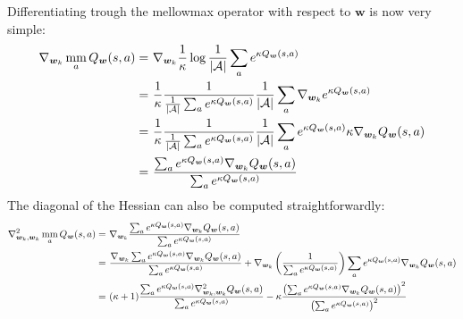 \documentclass{article}
\newcommand{\mm}{\operatornamewithlimits{mm}}
\begin{document}
Differentiating trough the mellowmax operator with respect to $\bm{w}$ is now very simple:
\begin{align}
\nabla_{\bm{w}_k}\mm_a Q_{\bm{w}}(s,a) =\ & 
\nabla_{\bm{w}_k} \frac{1}{\kappa} \log \frac{1}{|\mathcal{A}|}\sum_a e^{\kappa Q_{\bm{w}}(s,a)} \\ =\ &
\frac{1}{\kappa}\frac{1}{\frac{1}{|\mathcal{A}|}\sum_a e^{\kappa Q_{\bm{w}}(s,a)}}\frac{1}{|\mathcal{A}|}\sum_a \nabla_{\bm{w}_k} e^{\kappa Q_{\bm{w}}(s,a)} \\ =\ &
\frac{1}{\kappa}\frac{1}{\frac{1}{|\mathcal{A}|}\sum_a e^{\kappa Q_{\bm{w}}(s,a)}}\frac{1}{|\mathcal{A}|}\sum_a e^{\kappa Q_{\bm{w}}(s,a)} \kappa \nabla_{\bm{w}_k} Q_{\bm{w}}(s,a) \\ =\ &
\frac{\sum_a e^{\kappa Q_{\bm{w}}(s,a)} \nabla_{\bm{w}_k} Q_{\bm{w}}(s,a)}{\sum_a e^{\kappa Q_{\bm{w}}(s,a)}}
\end{align}
The diagonal of the Hessian can also be computed straightforwardly:
\begin{align}
\nabla_{\bm{w}_k,\bm{w}_k}^2 \mm_a Q_{\bm{w}}(s,a) =\ &
\nabla_{\bm{w}_k}\frac{\sum_a e^{\kappa Q_{\bm{w}}(s,a)} \nabla_{\bm{w}_k} Q_{\bm{w}}(s,a)}{\sum_a e^{\kappa Q_{\bm{w}}(s,a)}} \\ =\ &
\frac{\nabla_{\bm{w}_k}\sum_a e^{\kappa Q_{\bm{w}}(s,a)} \nabla_{\bm{w}_k} Q_{\bm{w}}(s,a)}{\sum_a e^{\kappa Q_{\bm{w}}(s,a)}} + \nabla_{\bm{w}_k}\left( \frac{1}{\sum_a e^{\kappa Q_{\bm{w}}(s,a)}} \right)\sum_a e^{\kappa Q_{\bm{w}}(s,a)} \nabla_{\bm{w}_k} Q_{\bm{w}}(s,a) \\ =\ &
(\kappa + 1)\frac{\sum_a e^{\kappa Q_{\bm{w}}(s,a)} \nabla_{\bm{w}_k,\bm{w}_k}^2 Q_{\bm{w}}(s,a)}{\sum_a e^{\kappa Q_{\bm{w}}(s,a)}} - \kappa\frac{\left(\sum_a e^{\kappa Q_{\bm{w}}(s,a)} \nabla_{\bm{w}_k} Q_{\bm{w}}(s,a)\right)^2}{\left(\sum_a e^{\kappa Q_{\bm{w}}(s,a)}\right)^2}
\end{align}
\end{document}
